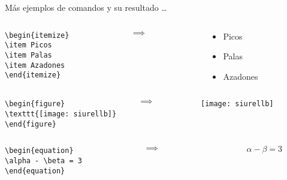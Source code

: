 \documentclass{beamer}
\begin{document}
\begin{frame}[fragile]{Más ejemplos de comandos y su resultado \ldots}


\begin{columns}
\begin{column}{4cm}
{\scriptsize
\begin{verbatim}
\begin{itemize}
\item Picos
\item Palas
\item Azadones
\end{itemize} 
\end{verbatim} 
}
\end{column}
\begin{column}{1cm}
$\implies$
\end{column}
\begin{column}{4cm}
\begin{itemize}
\item Picos
\item Palas
\item Azadones
\end{itemize} 
\end{column}
\end{columns}

\begin{columns}
\begin{column}{4cm}
{\scriptsize
\begin{verbatim}
\begin{figure}
\texttt{[image: siurellb]}
\end{figure}  
\end{verbatim}}
\end{column}
\begin{column}{1cm}
$\implies$
\end{column}
\begin{column}{4cm}
\begin{figure}
\texttt{[image: siurellb]}
\end{figure}
\end{column}
\end{columns}


\begin{columns}
\begin{column}{4cm}
{\scriptsize
\begin{verbatim}
\begin{equation}
\alpha - \beta = 3
\end{equation}
\end{verbatim}}
\end{column}
\begin{column}{1cm}
$\implies$
\end{column}
\begin{column}{4cm}
\begin{equation}
\alpha - \beta =3
\end{equation}
\end{column}
\end{columns}


\end{frame}
\end{document}
